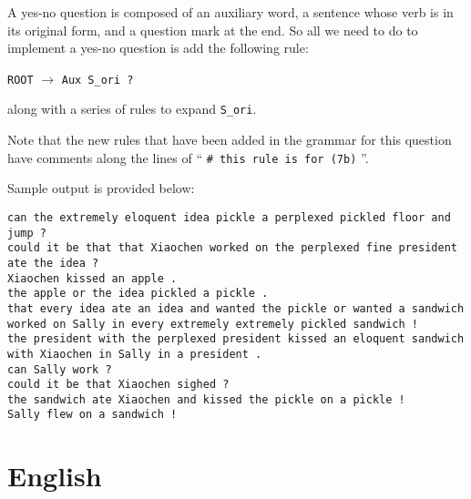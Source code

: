 \documentclass[11pt]{article}
\newcommand{\code}[1]{\texttt{#1}}
\begin{document}
\begin{enumerate}
	A yes-no question is composed of an auxiliary word, a sentence whose verb is in its original form, and a question mark at the end. So all we need to do to implement a yes-no question is add the following rule:
\begin{center}
	\code{ROOT} $\to$ \code{Aux S\_ori ?}
\end{center}
along with a series of rules to expand \code{S\_ori}.

Note that the new rules that have been added in the grammar for this question have comments along the lines of `` \code{\# this rule is for (7b)} ''.
\end{enumerate}
Sample output is provided below:
\begin{lstlisting}
can the extremely eloquent idea pickle a perplexed pickled floor and jump ?
could it be that that Xiaochen worked on the perplexed fine president ate the idea ?
Xiaochen kissed an apple .
the apple or the idea pickled a pickle .
that every idea ate an idea and wanted the pickle or wanted a sandwich worked on Sally in every extremely extremely pickled sandwich !
the president with the perplexed president kissed an eloquent sandwich with Xiaochen in Sally in a president .
can Sally work ?
could it be that Xiaochen sighed ?
the sandwich ate Xiaochen and kissed the pickle on a pickle !
Sally flew on a sandwich !
\end{lstlisting}

\section{English}
\end{document}
